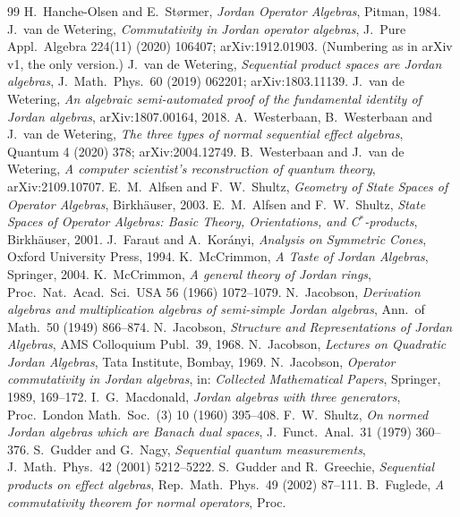 \documentclass[11pt]{article}
\theoremstyle{remark}
\begin{document}
\begin{thebibliography}{99}
\small
{} H.~Hanche-Olsen and E.~St{\o}rmer, \emph{Jordan Operator Algebras},
Pitman, 1984.
 J.~van de Wetering, \emph{Commutativity in Jordan operator algebras},
J.\ Pure Appl.\ Algebra 224(11) (2020) 106407; arXiv:1912.01903. (Numbering as in
arXiv v1, the only version.)
 J.~van de Wetering, \emph{Sequential product spaces are Jordan algebras},
J.\ Math.\ Phys.\ 60 (2019) 062201; arXiv:1803.11139.
 J.~van de Wetering, \emph{An algebraic semi-automated proof of the
fundamental identity of Jordan algebras}, arXiv:1807.00164, 2018.
 A.~Westerbaan, B.~Westerbaan and J.~van de Wetering, \emph{The three
types of normal sequential effect algebras}, Quantum 4 (2020) 378; arXiv:2004.12749.
 B.~Westerbaan and J.~van de Wetering, \emph{A computer scientist's
reconstruction of quantum theory}, arXiv:2109.10707.
 E.~M.~Alfsen and F.~W.~Shultz, \emph{Geometry of State Spaces of Operator
Algebras}, Birkh\"auser, 2003.
 E.~M.~Alfsen and F.~W.~Shultz, \emph{State Spaces of Operator Algebras:
Basic Theory, Orientations, and C$^*$-products}, Birkh\"auser, 2001.
 J.~Faraut and A.~Kor\'anyi, \emph{Analysis on Symmetric Cones}, Oxford
University Press, 1994.
 K.~McCrimmon, \emph{A Taste of Jordan Algebras}, Springer, 2004.
 K.~McCrimmon, \emph{A general theory of Jordan rings}, Proc.\ Nat.\ Acad.\
Sci.\ USA 56 (1966) 1072--1079.
 N.~Jacobson, \emph{Derivation algebras and multiplication algebras of
semi-simple Jordan algebras}, Ann.\ of Math.\ 50 (1949) 866--874.
\bibitem{Jac68} N.~Jacobson, \emph{Structure and Representations of Jordan Algebras},
AMS Colloquium Publ.\ 39, 1968.
 N.~Jacobson, \emph{Lectures on Quadratic Jordan Algebras}, Tata Institute,
Bombay, 1969.
 N.~Jacobson, \emph{Operator commutativity in Jordan algebras}, in:
\emph{Collected Mathematical Papers}, Springer, 1989, 169--172.
 I.~G.~Macdonald, \emph{Jordan algebras with three generators}, Proc.\
London Math.\ Soc.\ (3) 10 (1960) 395--408.
\bibitem{Shu79} F.~W.~Shultz, \emph{On normed Jordan algebras which are Banach dual
spaces}, J.\ Funct.\ Anal.\ 31 (1979) 360--376.
\bibitem{GN01} S.~Gudder and G.~Nagy, \emph{Sequential quantum measurements}, J.\ Math.\
Phys.\ 42 (2001) 5212--5222.
\bibitem{GG02} S.~Gudder and R.~Greechie, \emph{Sequential products on effect algebras},
Rep.\ Math.\ Phys.\ 49 (2002) 87--111.
\bibitem{Fug50} B.~Fuglede, \emph{A commutativity theorem for normal operators}, Proc.\

\end{thebibliography}
\end{document}
